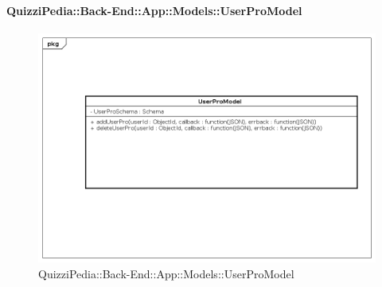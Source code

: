 \paragraph{QuizziPedia::Back-End::App::Models::UserProModel}
\label{QuizziPedia::Back-End::App::Models::UserProModel}
\begin{figure}
	\centering
	\includegraphics[scale=0.45]{UML/Package/QuizziPedia_Back-End_App_Models_userProModel.png}
	\caption{QuizziPedia::Back-End::App::Models::UserProModel}
\end{figure}
